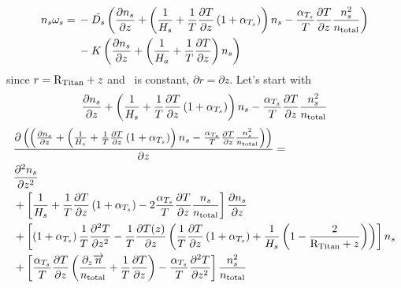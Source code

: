 \begin{equation}
\begin{split}
n_s\omega_s = &\: -\tilde{D_s} 
                        \left(\frac{\partial n_s}{\partial z} + \left(\frac{1}{H_s} + 
                                \frac{1}{T}\frac{\partial T}{\partial z}\left( 1 + \alpha_{T_s}\right)\right)n_s
                                - \frac{\alpha_{T_s}}{T}\frac{\partial T}{\partial z}\frac{n_s^2}{n_\text{total}}\right) \\
                  &\: - K \left(\frac{\partial n_s}{\partial z} + \left(\frac{1}{H_a} + \frac{1}{T}\frac{\partial T}{\partial z}\right)n_s\right)
\end{split}
\end{equation}
since $r = \text{R}_\text{Titan} + z$ and \RTitan\ is constant, $\partial r = \partial z$.
Let's start with 
\[
\frac{\partial n_s}{\partial z} + \left(\frac{1}{H_s} + 
                                \frac{1}{T}\frac{\partial T}{\partial z}\left(1 + \alpha_{T_s}\right)\right)n_s
                                - \frac{\alpha_{T_s}}{T}\frac{\partial T}{\partial z}\frac{n_s^2}{n_\text{total}}
\]
\begin{equation}
\begin{split}
& \frac{\partial\left(\left(\frac{\partial n_s}{\partial z}
                       + \left(\frac{1}{H_s} + \frac{1}{T}\frac{\partial T}{\partial z}\left(1 + \alpha_{T_s}\right)\right)n_s
                       - \frac{\alpha_{T_s}}{T}\frac{\partial T}{\partial z}\frac{n_s^2}{n_\text{total}}\right)\right)}{\partial z}
=  \\
  & \frac{\partial^2n_s}{\partial{z}^2} \\
  & + \left[\frac{1}{H_s}
            + \frac{1}{T}\frac{\partial T}{\partial z}\left(1 + \alpha_{T_s}\right)
            - 2 \frac{\alpha_{T_s}}{T}\frac{\partial T}{\partial z}\frac{n_s}{n_\text{total}}
     \right]\frac{\partial n_s}{\partial z} \\
  & + \left[\left(1 + \alpha_{T_s}\right)\frac{1}{T}\frac{\partial^2T}{\partial{z}^2} 
                   - \frac{1}{T}\frac{\partial T(z)}{\partial z}
                        \left(\frac{1}{T}\frac{\partial T}{\partial z}\left(1 + \alpha_{T_s}\right)
                              + \frac{1}{H_s}
                                        \left(1 - \frac{2}{\text{R}_\text{Titan} + z}\right)
                        \right)
            \right]n_s \\
  & + \left[\frac{\alpha_{T_s}}{T}\frac{\partial T}{\partial z}\left(
                \frac{\partial_{z}{\overrightarrow{n}}}{n_\text{total}}
                + \frac{1}{T}\frac{\partial T}{\partial z}\right)
      - \frac{\alpha_{T_s}}{T}\frac{\partial^2T}{\partial{z}^2}\right]\frac{n_s^2}{n_\text{total}}\\
\end{split}
\label{Titan:diff_deriv_D_fac}
\end{equation}
